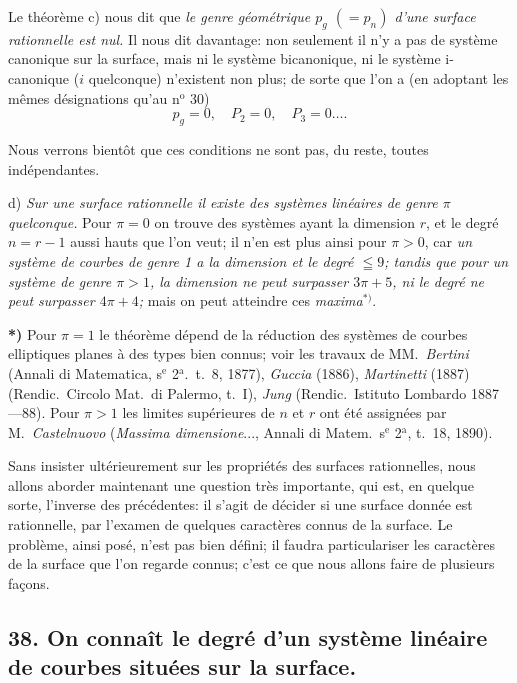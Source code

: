 \documentclass{article}
\begin{document}
Le théorème c) nous dit que \emph{le genre géométrique $p_{g}$ $(= p_{n})$ d'une surface rationnelle est nul.} Il nous dit davantage: non seulement il n'y a pas de système canonique sur la surface, mais ni le système bicanonique, ni le système i-canonique ($i$ quelconque) n'existent non plus; de sorte que l'on a (en adoptant les mêmes désignations qu'au n${}^{\text{o}}$ 30)
\[ p_{g} = 0, \quad P_{2} = 0, \quad P_{3} = 0 \ldots . \]

Nous verrons bientôt que ces conditions ne sont pas, du reste, toutes indépendantes.

d) \emph{Sur une surface rationnelle il existe des systèmes linéaires de genre $\pi$ quelconque.} Pour $\pi = 0$ on trouve des systèmes ayant la dimension $r$, et le degré $n = r - 1$ aussi hauts que l'on veut; il n'en est plus ainsi pour $\pi > 0$, car \emph{un système de courbes de genre 1 a la dimension et le degré $\leqq 9$; tandis que pour un système de genre $\pi > 1$, la dimension ne peut surpasser $3\pi + 5$, ni le degré ne peut surpasser $4\pi + 4$;} mais on peut atteindre ces \emph{maxima}${}^{*)}$.

\textbf{*)} Pour $\pi = 1$ le théorème dépend de la réduction des systèmes de courbes elliptiques planes à des types bien connus; voir les travaux de MM.\ \emph{Bertini} (Annali di Matematica, s${}^{\text{e}}$ 2${}^{\text{a}}$.\ t.\ 8, 1877), \emph{Guccia} (1886), \emph{Martinetti} (1887) (Rendic.\ Circolo Mat.\ di Palermo, t.\ I), \emph{Jung} (Rendic.\ Istituto Lombardo 1887---88). Pour $\pi > 1$ les limites supérieures de $n$ et $r$ ont été assignées par M.\ \emph{Castelnuovo} (\emph{Massima dimensione}..., Annali di Matem.\ s${}^{\text{e}}$ 2${}^{\text{a}}$, t.\ 18, 1890).


Sans insister ultérieurement sur les propriétés des surfaces rationnelles, nous allons aborder maintenant une question très importante, qui est, en quelque sorte, l'inverse des précédentes: il s'agit de décider si une surface donnée est rationnelle, par l'examen de quelques caractères connus de la surface. Le problème, ainsi posé, n'est pas bien défini; il faudra particulariser les caractères de la surface que l'on regarde connus; c'est ce que nous allons faire de plusieurs façons.

\subsection*{38. On connaît le degré d'un système linéaire de courbes situées sur la surface.}
\end{document}
